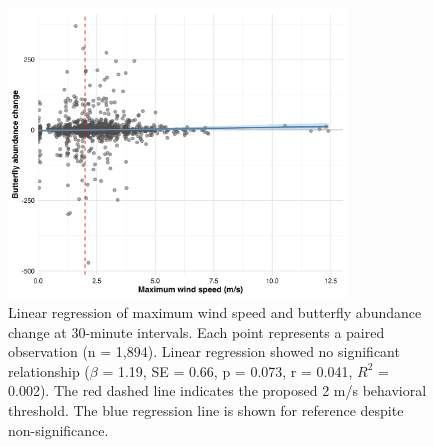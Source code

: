 \begin{figure}[htbp]
    \centering
    \includegraphics[width=0.8\textwidth]{supplemental/results/30_min/figures/wind_vs_change_bivariate_untransformed.png}
    \caption[Wind speed vs. abundance change (30-minute)]{Linear regression of maximum wind speed and butterfly abundance change at 30-minute intervals. Each point represents a paired observation (n = 1,894). Linear regression showed no significant relationship ($\beta$ = 1.19, SE = 0.66, p = 0.073, r = 0.041, $R^2$ = 0.002). The red dashed line indicates the proposed 2 m/s behavioral threshold. The blue regression line is shown for reference despite non-significance.}
    \label{fig:wind_linear_regression_30min}
\end{figure}

